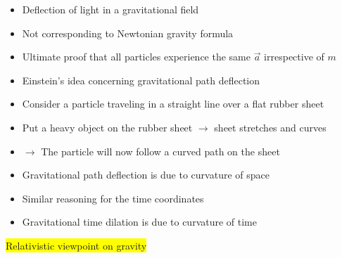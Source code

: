 \onecolumn
\begin{itemize}
\item Deflection of light in a gravitational field
\item[] Not corresponding to Newtonian gravity formula
\item[] Ultimate proof that all particles experience the same $\vec{a}$ irrespective of $m$
\item Einstein's idea concerning gravitational path deflection
\item[] Consider a particle traveling in a straight line over a flat rubber sheet
\item[] Put a heavy object on the rubber sheet $\rightarrow$ sheet stretches and curves
\item[] $\rightarrow$ The particle will now follow a curved path on the sheet
\item[] {\blue Gravitational path deflection is due to curvature of space}
\item Similar reasoning for the time coordinates
\item[] {\blue Gravitational time dilation is due to curvature of time}
\end{itemize}
%
\begin{center}
\colorbox{yellow}{Relativistic viewpoint on gravity}\\[3mm]
{\red {}}\\[3mm]
{\red {}}
\end{center}

